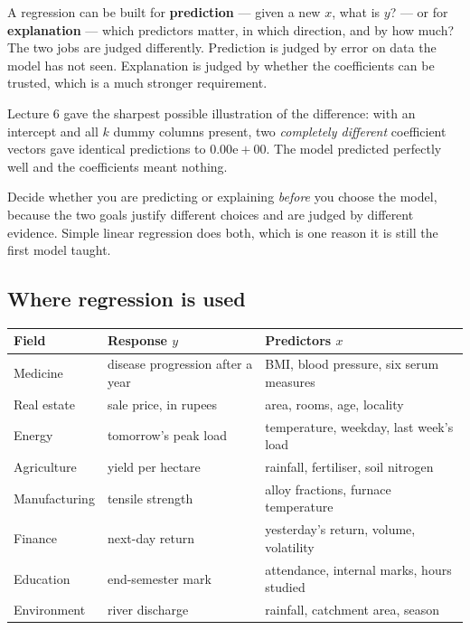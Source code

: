\documentclass[11pt]{article}
\begin{document}
A regression can be built for \textbf{prediction} --- given a new $x$, what
is $y$? --- or for \textbf{explanation} --- which predictors matter, in which
direction, and by how much? The two jobs are judged differently. Prediction is
judged by error on data the model has not seen. Explanation is judged by
whether the coefficients can be trusted, which is a much stronger requirement.

Lecture 6 gave the sharpest possible illustration of the difference: with an
intercept and all $k$ dummy columns present, two \emph{completely different}
coefficient vectors gave identical predictions to $0.00\mathrm{e}{+}00$. The
model predicted perfectly well and the coefficients meant nothing.

\begin{keyidea}
Decide whether you are predicting or explaining \emph{before} you choose the
model, because the two goals justify different choices and are judged by
different evidence. Simple linear regression does both, which is one reason
it is still the first model taught.
\end{keyidea}

\subsection{Where regression is used}

\begin{center}\small
\begin{tabular}{@{}lll@{}}
  \toprule
  \textbf{Field} & \textbf{Response $y$} & \textbf{Predictors $x$}\\
  \midrule
  Medicine & disease progression after a year &
    BMI, blood pressure, six serum measures\\
  Real estate & sale price, in rupees & area, rooms, age, locality\\
  Energy & tomorrow's peak load &
    temperature, weekday, last week's load\\
  Agriculture & yield per hectare & rainfall, fertiliser, soil nitrogen\\
  Manufacturing & tensile strength &
    alloy fractions, furnace temperature\\
  Finance & next-day return & yesterday's return, volume, volatility\\
  Education & end-semester mark &
    attendance, internal marks, hours studied\\
  Environment & river discharge & rainfall, catchment area, season\\
  \bottomrule
\end{tabular}
\end{center}
\end{document}
